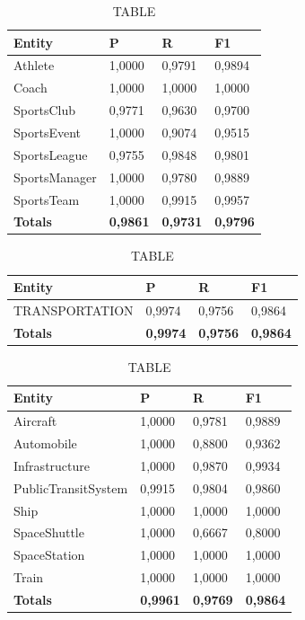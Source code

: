 \documentclass[thesis=M,english]{FITthesis}[2018/05/30]
\begin{document}
	\begin{table}[H]\centering
		\caption{TABLE}
		\label{}
		\begin{tabular}{|l|l|l|l|}
			\hline {\textbf{Entity}} & {\textbf{P}} & {\textbf{R}} & {\textbf{F1}}\\\hline
				Athlete & 1,0000 & 0,9791 & 0,9894\\
				Coach & 1,0000 & 1,0000 & 1,0000\\
				SportsClub & 0,9771 & 0,9630 & 0,9700\\
				SportsEvent & 1,0000 & 0,9074 & 0,9515\\
				SportsLeague & 0,9755 & 0,9848 & 0,9801\\
				SportsManager & 1,0000 & 0,9780 & 0,9889\\				
				SportsTeam & 1,0000 & 0,9915 & 0,9957\\\hline
				\textbf{Totals} & \textbf{0,9861} & \textbf{0,9731} & \textbf{0,9796}\\\hline
		\end{tabular}
	\end{table}	

	\begin{table}[H]\centering
		\caption{TABLE}
		\label{}
		\begin{tabular}{|l|l|l|l|}
			\hline {\textbf{Entity}} & {\textbf{P}} & {\textbf{R}} & {\textbf{F1}}\\\hline
				TRANSPORTATION & 0,9974 & 0,9756 & 0,9864\\\hline
				\textbf{Totals} & \textbf{0,9974} & \textbf{0,9756} & \textbf{0,9864}\\\hline
		\end{tabular}
	\end{table}
	
	
	\begin{table}[H]\centering
		\caption{TABLE}
		\label{}
		\begin{tabular}{|l|l|l|l|}
			\hline {\textbf{Entity}} & {\textbf{P}} & {\textbf{R}} & {\textbf{F1}}\\\hline
				Aircraft & 1,0000 & 0,9781 & 0,9889\\
				Automobile & 1,0000 & 0,8800 & 0,9362\\				
				Infrastructure & 1,0000 & 0,9870 & 0,9934\\
				PublicTransitSystem & 0,9915 & 0,9804 & 0,9860\\
				Ship & 1,0000 & 1,0000 & 1,0000\\				
				SpaceShuttle & 1,0000 & 0,6667 & 0,8000\\
				SpaceStation & 1,0000 & 1,0000 & 1,0000\\
				Train & 1,0000 & 1,0000 & 1,0000\\\hline
				\textbf{Totals} & \textbf{0,9961} & \textbf{0,9769} & \textbf{0,9864}\\\hline
		\end{tabular}
	\end{table}	
		
\end{document}
